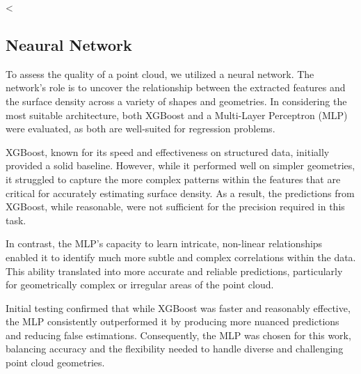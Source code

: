 <\subsection{Neaural Network}
To assess the quality of a point cloud, we utilized a neural network. The network’s role is to uncover the relationship between the extracted features and the surface density across a variety of shapes and geometries. In considering the most suitable architecture, both XGBoost and a Multi-Layer Perceptron (MLP) were evaluated, as both are well-suited for regression problems.

XGBoost, known for its speed and effectiveness on structured data, initially provided a solid baseline. However, while it performed well on simpler geometries, it struggled to capture the more complex patterns within the features that are critical for accurately estimating surface density. As a result, the predictions from XGBoost, while reasonable, were not sufficient for the precision required in this task.

In contrast, the MLP’s capacity to learn intricate, non-linear relationships enabled it to identify much more subtle and complex correlations within the data. This ability translated into more accurate and reliable predictions, particularly for geometrically complex or irregular areas of the point cloud.

Initial testing confirmed that while XGBoost was faster and reasonably effective, the MLP consistently outperformed it by producing more nuanced predictions and reducing false estimations. Consequently, the MLP was chosen for this work, balancing accuracy and the flexibility needed to handle diverse and challenging point cloud geometries.



